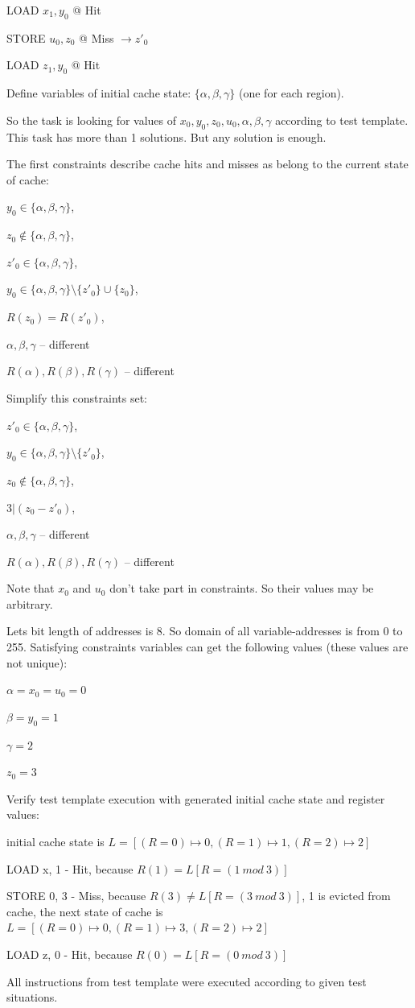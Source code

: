 LOAD $x_1, y_0$ @ Hit

STORE $u_0, z_0$ @ Miss $\rightarrow z'_0$

LOAD $z_1, y_0$ @ Hit

Define variables of initial cache state: $\{ \alpha, \beta, \gamma
\}$ (one for each region).

So the task is looking for values of $x_0, y_0, z_0, u_0, \alpha,
\beta, \gamma$ according to test template. This task has more than 1
solutions. But any solution is enough.

The first constraints describe cache hits and misses as belong to
the current state of cache:

$y_0 \in \{ \alpha, \beta, \gamma \}$,

$z_0 \notin \{ \alpha, \beta, \gamma \}$,

$z'_0 \in \{ \alpha, \beta, \gamma \}$,

$y_0 \in \{ \alpha, \beta, \gamma \} \setminus \{z'_0 \} \cup \{ z_0
\}$,

$R(z_0) = R(z'_0)$,

$\alpha, \beta, \gamma$ -- different

$R(\alpha), R(\beta), R(\gamma)$ -- different

Simplify this constraints set:

$z'_0 \in \{ \alpha, \beta, \gamma \}$,

$y_0 \in \{ \alpha, \beta, \gamma \} \setminus \{z'_0\}$,

$z_0 \notin \{ \alpha, \beta, \gamma \}$,

$ 3 | ( z_0 - z'_0 )$,

$\alpha, \beta, \gamma$ -- different

$R(\alpha), R(\beta), R(\gamma)$ -- different

Note that $x_0$ and $u_0$ don't take part in constraints. So their
values may be arbitrary.

Lets bit length of addresses is 8. So domain of all
variable-addresses is from 0 to 255. Satisfying constraints
variables can get the following values (these values are not
unique):

$\alpha = x_0 = u_0 = 0$

$\beta = y_0 = 1$

$\gamma = 2$

$z_0 = 3$

Verify test template execution with generated initial cache state
and register values:

initial cache state is $L = [(R=0) \mapsto 0, (R=1) \mapsto 1, (R=2)
\mapsto 2]$

LOAD x, 1 - Hit, because $R(1) = L[R=(1~mod~3)]$

STORE 0, 3 - Miss, because $R(3) \neq L[R=( 3~mod~3 )]$, 1 is
evicted from cache, the next state of cache is $L = [(R=0) \mapsto
0, (R=1) \mapsto 3, (R=2) \mapsto 2]$

LOAD z, 0 - Hit, because $R(0) = L[R=(0~mod~3)]$

All instructions from test template were executed according to given
test situations.
